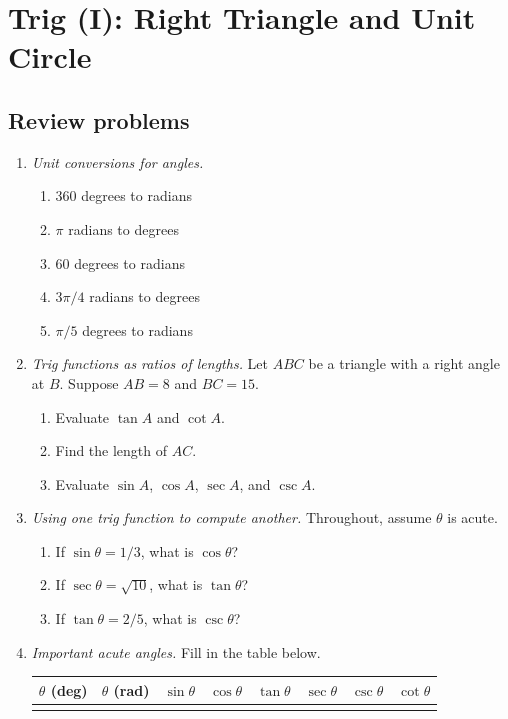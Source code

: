 \section{Trig (I): Right Triangle and Unit Circle}

\subsection{Review problems}

\begin{enumerate}
\item \emph{Unit conversions for angles.}
\begin{enumerate}
\item 360 degrees to radians
\item $\pi$ radians to degrees
\item 60 degrees to radians
\item $3\pi/4$ radians to degrees
\item $\pi/5$ degrees to radians
\end{enumerate}
\item \emph{Trig functions as ratios of lengths.} Let $ABC$ be a triangle with a right angle at $B$. Suppose $AB = 8$ and $BC = 15$.
\begin{enumerate}
\item Evaluate $\tan A$ and $\cot A$.
\item Find the length of $AC$.
\item Evaluate $\sin A$, $\cos A$, $\sec A$, and $\csc A$.
\end{enumerate}
\item \emph{Using one trig function to compute another.} Throughout, assume $\theta$ is acute.
\begin{enumerate}
\item If $\sin\theta = 1/3$, what is $\cos\theta$?
\item If $\sec\theta = \sqrt{10}$, what is $\tan\theta$?
\item If $\tan\theta = 2/5$, what is $\csc\theta$?
\end{enumerate}
\item \emph{Important acute angles.} Fill in the table below.
\begin{center}
\begin{tabular}{c|c||c|c|c|c|c|c}
$\theta$ (deg) & $\theta$ (rad) & $\sin\theta$ & $\cos\theta$ & $\tan\theta$ & $\sec\theta$ & $\csc\theta$ & $\cot\theta$ \\ \hline
 & & & & & & & \\

\end{tabular}
\end{center}
\end{enumerate}

